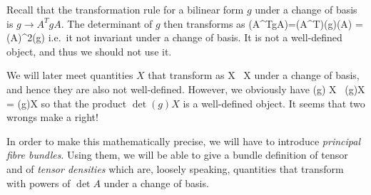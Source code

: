 Recall that the transformation rule for a bilinear form $g$ under a change of basis is $g \to A^TgA$. The determinant of $g$ then transforms as
\bse
\det(A^TgA)=\det(A^T)\det(g)\det(A) = (\det A)^2\det(g)
\ese
i.e.\ it not invariant under a change of basis. It is not a well-defined object, and thus we should not use it. 

We will later meet quantities $X$ that transform as
\bse
X \to {} \, X
\ese
under a change of basis, and hence they are also not well-defined. However, we obviously have
\bse
\det(g) X \to {} \, \det(g)X = \det(g)X
\ese
so that the product $\det(g)X$ is a well-defined object. It seems that two wrongs make a right!

In order to make this mathematically precise, we will have to introduce \emph{principal fibre bundles}. Using them, we will be able to give a bundle definition of tensor and of \emph{tensor densities} which are, loosely speaking, quantities that transform with powers of $\det A$ under a change of basis.
\er
































